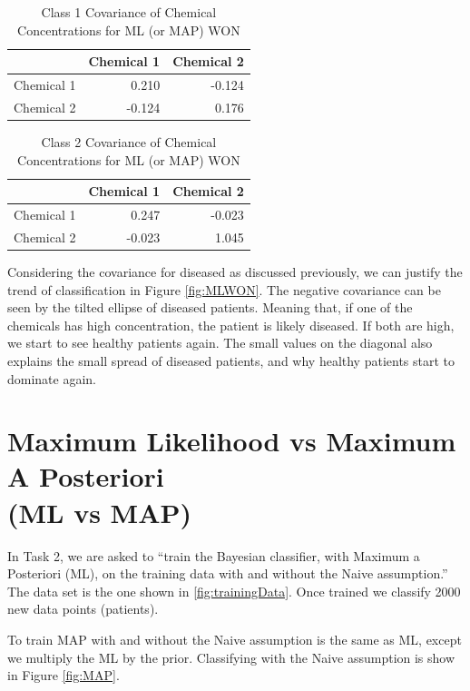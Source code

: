 {\begin{table}[h]
	\centering
	\caption{Class 1 Covariance of Chemical Concentrations for ML (or MAP) WON}
	\label{t:cov1}
	\begin{tabular}{lrr}
		\hline
		\textbf{} & \textbf{Chemical 1} & \textbf{Chemical 2} \\ \hline
		Chemical 1 & 0.210 & -0.124 \\
		Chemical 2 & -0.124 & 0.176  \\
	\end{tabular}
\end{table}

\begin{table}[h]
	\centering
	\caption{Class 2 Covariance of Chemical Concentrations for ML (or MAP) WON}
	\label{t:cov2}
	\begin{tabular}{lrr}
		\hline
		\textbf{} & \textbf{Chemical 1} & \textbf{Chemical 2} \\ \hline
		Chemical 1 & 0.247 & -0.023 \\
		Chemical 2 & -0.023 & 1.045  \\
	\end{tabular}
\end{table}

Considering the covariance for diseased as discussed previously, we can justify the trend of classification in Figure \ref{fig:MLWON}. The negative covariance can be seen by the tilted ellipse of diseased patients. Meaning that, if one of the chemicals has high concentration, the patient is likely diseased. If both are high, we start to see healthy patients again. The small values on the diagonal also explains the small spread of diseased patients, and why healthy patients start to dominate again. 

\section{Maximum Likelihood vs Maximum A Posteriori \\ (ML vs MAP)}{\label{s1}
In Task 2, we are asked to ``train the Bayesian classifier, with Maximum a Posteriori (ML), on the training data with and without the Naive assumption.'' The data set is the one shown in \ref{fig:trainingData}. Once trained we classify 2000 new data points (patients).

To train MAP with and without the Naive assumption is the same as ML, except we multiply the ML by the prior. Classifying with the Naive assumption is show in Figure \ref{fig:MAP}.

}}

